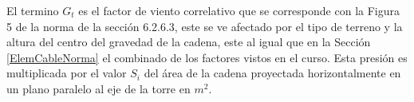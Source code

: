 El termino $G_t$ es el factor de viento correlativo que se corresponde con la Figura 5 de la norma de la sección 6.2.6.3, este se ve afectado por el tipo de terreno y la altura del centro del gravedad de la cadena, este al igual que en la Sección \ref{ElemCableNorma} el combinado de los factores vistos en el curso. Esta presión es multiplicada por el valor $S_i$ del área de la cadena proyectada horizontalmente en un plano paralelo al eje de la torre en $m^2$.
